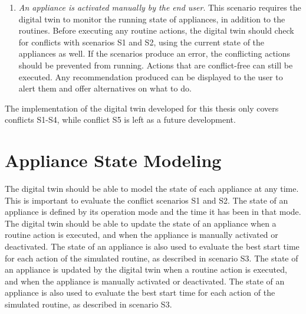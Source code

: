 \begin{enumerate}[label={\textit{S\arabic*.}}, leftmargin=3.5em]
    \item \textit{An appliance is activated manually by the end user}. This scenario requires the digital twin to monitor the running state of appliances, in addition to the routines. Before executing any routine actions, the digital twin should check for conflicts with scenarios S1 and S2, using the current state of the appliances as well. If the scenarios produce an error, the conflicting actions should be prevented from running. Actions that are conflict-free can still be executed. Any recommendation produced can be displayed to the user to alert them and offer alternatives on what to do.
\end{enumerate}

The implementation of the digital twin developed for this thesis only covers conflicts S1-S4, while conflict S5 is left as a future development.

\section{Appliance State Modeling}

The digital twin should be able to model the state of each appliance at any time. This is important to evaluate the conflict scenarios S1 and S2. The state of an appliance is defined by its operation mode and the time it has been in that mode. The digital twin should be able to update the state of an appliance when a routine action is executed, and when the appliance is manually activated or deactivated. The state of an appliance is also used to evaluate the best start time for each action of the simulated routine, as described in scenario S3. The state of an appliance is updated by the digital twin when a routine action is executed, and when the appliance is manually activated or deactivated. The state of an appliance is also used to evaluate the best start time for each action of the simulated routine, as described in scenario S3.

